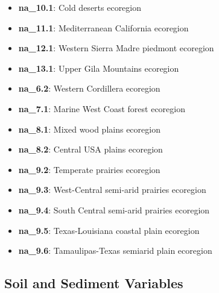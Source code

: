 \documentclass[
]{article}
\providecommand{\tightlist}{%
  \setlength{\itemsep}{0pt}\setlength{\parskip}{0pt}}
\begin{document}
\begin{itemize}
\tightlist
\item
  \textbf{na\_10.1}: Cold deserts ecoregion
\item
  \textbf{na\_11.1}: Mediterranean California ecoregion
\item
  \textbf{na\_12.1}: Western Sierra Madre piedmont ecoregion
\item
  \textbf{na\_13.1}: Upper Gila Mountains ecoregion
\item
  \textbf{na\_6.2}: Western Cordillera ecoregion
\item
  \textbf{na\_7.1}: Marine West Coast forest ecoregion
\item
  \textbf{na\_8.1}: Mixed wood plains ecoregion
\item
  \textbf{na\_8.2}: Central USA plains ecoregion
\item
  \textbf{na\_9.2}: Temperate prairies ecoregion
\item
  \textbf{na\_9.3}: West-Central semi-arid prairies ecoregion
\item
  \textbf{na\_9.4}: South Central semi-arid prairies ecoregion
\item
  \textbf{na\_9.5}: Texas-Louisiana coastal plain ecoregion
\item
  \textbf{na\_9.6}: Tamaulipas-Texas semiarid plain ecoregion
\end{itemize}

\hypertarget{soil-and-sediment-variables}{%
\subsection{Soil and Sediment
Variables}\label{soil-and-sediment-variables}}
\end{document}
